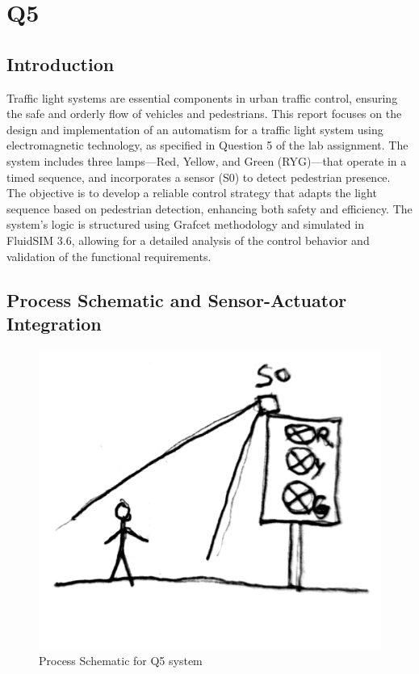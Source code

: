 \section{Q5} 

\subsection{Introduction} \label{sec:Introduction}

Traffic light systems are essential components in urban traffic control, ensuring the safe and orderly flow of 
vehicles and pedestrians. This report focuses on the design and implementation of an automatism for a traffic 
light system using electromagnetic technology, as specified in Question 5 of the lab assignment. The system 
includes three lamps—Red, Yellow, and Green (RYG)—that operate in a timed sequence, and incorporates a sensor 
(S0) to detect pedestrian presence. The objective is to develop a reliable control strategy that adapts the 
light sequence based on pedestrian detection, enhancing both safety and efficiency. The system’s logic is 
structured using Grafcet methodology and simulated in FluidSIM 3.6, allowing for a detailed analysis of the 
control behavior and validation of the functional requirements.

\subsection{Process Schematic and Sensor-Actuator Integration} \label{sec:Process_Schematic_and_Sensor-Actuator_Integration}

\begin{figure}[H]
    \includegraphics[width=16cm]{Images/Q5/Q5_schem.jpeg}
    \centering
    \caption{Process Schematic for Q5 system}
    \label{fig:Q5_schem}
\end{figure}

